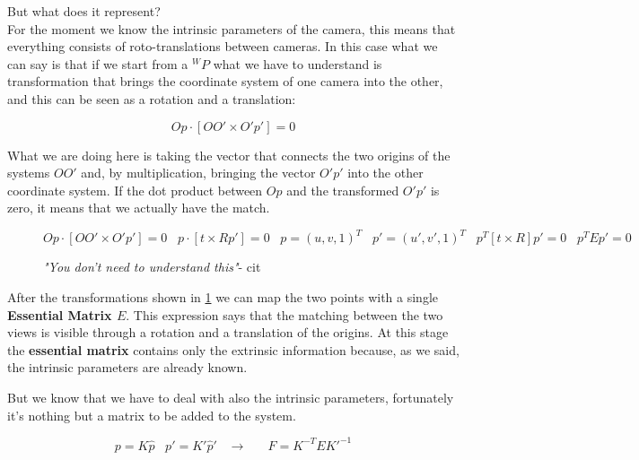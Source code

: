 But what does it represent? \\
For the moment we know the intrinsic parameters of the camera, this means that everything consists of roto-translations between cameras. In this case what we can say is that if we start from a \({}^WP\) what we have to understand is transformation that brings the coordinate system of one camera into the other, and this can be seen as a rotation and a translation:

\[
    Op\cdot[OO'\times O'p'] = 0
\]

What we are doing here is taking the vector that connects the two origins of the systems \(OO'\) and, by multiplication, bringing the vector \(O'p'\) into the other coordinate system. If the dot product between \(Op\) and the transformed \(O'p'\) is zero, it means that we actually have the match.

\begin{figure}[H]
\[
    Op\cdot[OO'\times O'p'] = 0 \;\;\;
    p\cdot[t\times Rp'] = 0 \;\;\;
    p = (u,v,1)^T \;\;\;
    p' = (u',v',1)^T \;\;\;
    p^T[t\times R]p'=0 \;\;\;
    p^TEp'=0    
\]
\caption{\textit{"You don't need to understand this"}- cit}
\label{eq:ess}
\end{figure}

After the transformations shown in \ref{eq:ess} we can map the two points with a single \textbf{Essential Matrix \(E\)}. This expression says that the matching between the two views is visible through a rotation and a translation of the origins. At this stage the \textbf{essential matrix} contains only the extrinsic information because, as we said, the intrinsic parameters are already known.

But we know that we have to deal with also the intrinsic parameters, fortunately it's nothing but a matrix to be added to the system.

\[
    p = K\hat{p} \;\;\;
    p' = K'\hat{p}' \;\;\;
    \rightarrow \;\;\;\;\;\; 
    F= K^{-T}EK'^{-1}
\]

